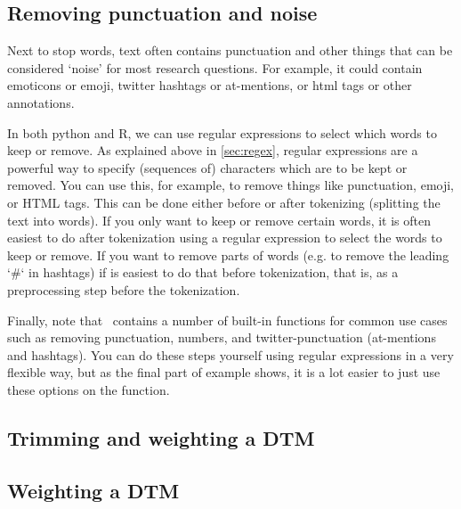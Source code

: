 

\subsection{Removing punctuation and noise}

Next to stop words, text often contains punctuation and other things that can be considered `noise' for most research questions.
For example, it could contain emoticons or emoji, twitter hashtags or at-mentions, or html tags or other annotations.

In both python and R, we can use regular expressions to select which words to keep or remove.
As explained above in \ref{sec:regex}, regular expressions are a powerful way to specify (sequences of) characters which are to be kept or removed.
You can use this, for example, to remove things like punctuation, emoji, or HTML tags.
This can be done either before or after tokenizing (splitting the text into words). 
If you only want to keep or remove certain words, it is often easiest to do after tokenization
using a regular expression to select the words to keep or remove.
If you want to remove parts of words (e.g. to remove the leading `\#` in hashtags) if is easiest to do that before tokenization,
that is, as a preprocessing step before the tokenization.

Finally, note that \quanteda\ contains a number of built-in functions for common use cases such as removing
punctuation, numbers, and twitter-punctuation (at-mentions and hashtags).
You can do these steps yourself using regular expressions in a very flexible way, but as the final part of example 
shows, it is a lot easier to just use these options on the  function. 


\subsection{Trimming and weighting a DTM}




\subsection{Weighting a DTM}

